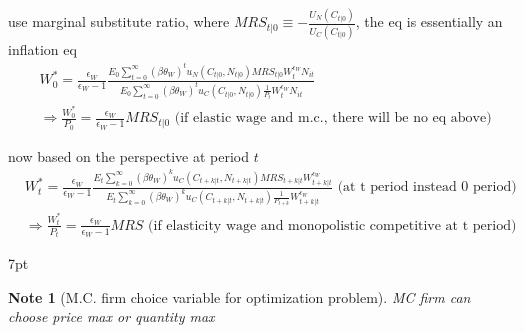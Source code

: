 \documentclass{article}
\newenvironment{blueblock}{
\def\FrameCommand{
  \hspace{1pt}
    {\color{DarkBlue}
    \vrule width 2pt}
    {\color{blueshade}
    \vrule width 4pt}
  \colorbox{blueshade}
}
\MakeFramed{
  \advance
  \hsize-
  \width
  \FrameRestore}
\noindent\hspace{-4.55pt}%
\begin{adjustwidth}{}{7pt}
\vspace{2pt}\vspace{2pt}
}
{\vspace{2pt}\end{adjustwidth}\endMakeFramed}
\newtheorem{note}{Note}
\begin{document}
use marginal substitute ratio, where $MRS_{t|0}\equiv -\frac{U_N(C_{t|0})}{U_C(C_{t|0})}$, the eq is essentially an inflation eq
\begin{align}
& W_0^*= \frac{\epsilon_W}{\epsilon_W-1}
\frac{
E_0 \sum\limits_{t=0}^{\infty} (\beta \theta_W)^t u_N(C_{t|0},N_{t|0})MRS_{t|0} W_t^{\epsilon_W}N_{it}
}{
E_0 \sum\limits_{t=0}^{\infty} (\beta \theta_W)^t u_C(C_{t|0},N_{t|0})\frac{1}{P_t} W_t^{\epsilon_W} N_{it}
}
\\& \Rightarrow \frac{W_0^*}{P_0}=\frac{\epsilon_W}{\epsilon_W-1}MRS_{t|0} \text{ (if elastic wage and m.c., there will be no eq above)}
\end{align}

now based on the perspective at period $t$
\begin{align}
& W_t^* = \frac{\epsilon_W}{\epsilon_W-1} 
\frac{E_t \sum\limits_{k=0}^{\infty}(\beta \theta_W)^k u_C(C_{t+k|t},N_{t+k|t})MRS_{t+k|t}W^{\epsilon_W}_{t+k|t}}{E_t \sum\limits_{k=0}^{\infty}(\beta \theta_W)^k u_C(C_{t+k|t},N_{t+k|t})\frac{1}{P_{t+k}}W^{\epsilon_W}_{t+k|t}}
\text{ (at t period instead 0 period)}
\\& \Rightarrow \frac{W_t^*}{P_t}=\frac{\epsilon_W}{\epsilon_W-1}MRS \text{ (if elasticity wage and monopolistic competitive at t period)}
\end{align}


\begin{blueblock}
\begin{note}[M.C. firm choice variable for optimization problem]
MC firm can choose price max or quantity max
\end{note}
\end{blueblock}
\end{document}
